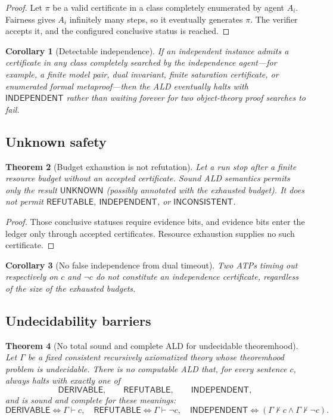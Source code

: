 \documentclass[11pt]{article}
\newtheorem{theorem}{Theorem}[section]
\newtheorem{corollary}[theorem]{Corollary}
\theoremstyle{definition}
\theoremstyle{remark}
\newcommand{\Unknown}{\mathsf{UNKNOWN}}
\newcommand{\Der}{\mathsf{DERIVABLE}}
\newcommand{\Refut}{\mathsf{REFUTABLE}}
\newcommand{\Ind}{\mathsf{INDEPENDENT}}
\newcommand{\Inc}{\mathsf{INCONSISTENT}}
\newcommand{\Gammaa}{\Gamma}
\begin{document}
\begin{proof}
Let $\pi$ be a valid certificate in a class completely enumerated by agent $A_i$. Fairness gives $A_i$ infinitely many steps, so it eventually generates $\pi$. The verifier accepts it, and the configured conclusive status is reached.
\end{proof}

\begin{corollary}[Detectable independence]
If an independent instance admits a certificate in any class completely searched by the independence agent---for example, a finite model pair, dual invariant, finite saturation certificate, or enumerated formal metaproof---then the ALD eventually halts with $\Ind$ rather than waiting forever for two object-theory proof searches to fail.
\end{corollary}

\subsection{Unknown safety}
\begin{theorem}[Budget exhaustion is not refutation]
Let a run stop after a finite resource budget without an accepted certificate. Sound ALD semantics permits only the result $\Unknown$ (possibly annotated with the exhausted budget). It does not permit $\Refut$, $\Ind$, or $\Inc$.
\end{theorem}

\begin{proof}
Those conclusive statuses require evidence bits, and evidence bits enter the ledger only through accepted certificates. Resource exhaustion supplies no such certificate.
\end{proof}

\begin{corollary}[No false independence from dual timeout]
Two ATPs timing out respectively on $c$ and $\neg c$ do not constitute an independence certificate, regardless of the size of the exhausted budgets.
\end{corollary}

\subsection{Undecidability barriers}
\begin{theorem}[No total sound and complete ALD for undecidable theoremhood]
Let $\Gammaa$ be a fixed consistent recursively axiomatized theory whose theoremhood problem is undecidable. There is no computable ALD that, for every sentence $c$, always halts with exactly one of
\[
\Der,\qquad \Refut,\qquad \Ind,
\]
and is sound and complete for these meanings:
\[
\Der\Longleftrightarrow\Gammaa\vdash c,
\quad
\Refut\Longleftrightarrow\Gammaa\vdash\neg c,
\quad
\Ind\Longleftrightarrow(\Gammaa\nvdash c\wedge\Gammaa\nvdash\neg c).
\]
\end{theorem}
\end{document}
